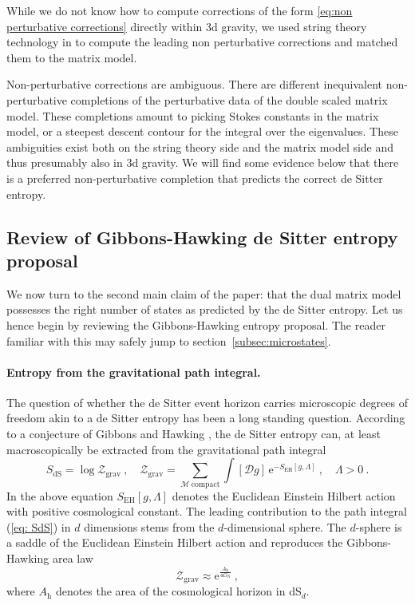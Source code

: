 \documentclass[12pt,a4paper]{article}
\begin{document}
While we do not know how to compute corrections of the form \eqref{eq:non perturbative corrections} directly within 3d gravity, we used string theory technology in \cite{paper3} to compute the leading non perturbative corrections and matched them to the matrix model. 

Non-perturbative corrections are ambiguous. There are different inequivalent non-perturbative completions of the perturbative data of the double scaled matrix model. These completions amount to picking Stokes constants in the matrix model, or a steepest descent contour for the integral over the eigenvalues. These ambiguities exist both on the string theory side and the matrix model side and thus presumably also in 3d gravity. We will find some evidence below that there is a preferred non-perturbative completion that predicts the correct de Sitter entropy.

\subsection{Review of Gibbons-Hawking de Sitter entropy proposal}\label{subsec:subsectionGH}

We now turn to the second main claim of the paper: that the dual matrix model possesses the right number of states as predicted by the de Sitter entropy. Let us hence begin by reviewing the Gibbons-Hawking entropy proposal. The reader familiar with this may safely jump to section~\ref{subsec:microstates}.

\paragraph{Entropy from the gravitational path integral.}
The question of whether the de Sitter event horizon carries microscopic degrees of freedom akin to a de Sitter entropy has been a long standing question. According to a conjecture of Gibbons and Hawking \cite{Gibbons:1976ue, Gibbons:1977mu}, the de Sitter entropy can, at least macroscopically be extracted from the gravitational path integral
\begin{equation}\label{eq: SdS}
    S_{\mathrm{dS}} = \log \mathcal{Z}_{\mathrm{grav}}~,\quad \mathcal{Z}_{\mathrm{grav}} = \sum_{\mathcal{M} ~\mathrm{compact}}\int [\mathcal{D}g]\,\mathrm{e}^{-S_{\mathrm{EH}}[g,\Lambda]}~,\quad \Lambda >0~.
\end{equation}
In the above equation $S_{\mathrm{EH}}[g,\Lambda]$ denotes the Euclidean Einstein Hilbert action with positive cosmological constant. The leading contribution to the path integral (\ref{eq: SdS}) in $d$ dimensions stems from the $d$-dimensional sphere. The $d$-sphere is a saddle of the Euclidean Einstein Hilbert action and reproduces the Gibbons-Hawking area law
\begin{equation}
  \mathcal{Z}_{\mathrm{grav}} \approx \mathrm{e}^{\frac{A_{\text{h}}}{4G_{\text{N}}}}~,  
\end{equation}
where $A_{\text{h}}$ denotes the area of the cosmological horizon in dS$_d$. 
\end{document}
